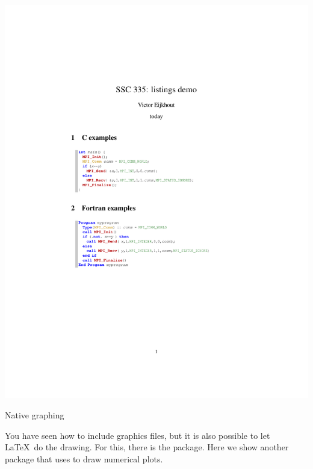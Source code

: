 \includegraphics[scale=.75]{code/latexdemo/listing}

 {Native graphing}

You have seen how to include graphics files,
but it is also possible to let \LaTeX\ do the drawing.
For this, there is the  package.
Here we show another package 
that uses  to draw numerical plots.

\begin{multicols}{2}
\end{multicols}

